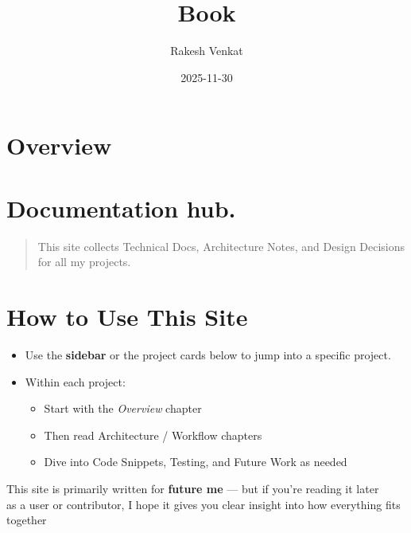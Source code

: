 \documentclass[
  letterpaper,
  DIV=11,
  numbers=noendperiod]{scrreprt}
\title{Book}
\author{Rakesh Venkat}
\date{2025-11-30}
\providecommand{\tightlist}{%
  \setlength{\itemsep}{0pt}\setlength{\parskip}{0pt}}
\renewcommand*\contentsname{Table of contents}
\newcommand\contentsname{Table of contents}
\begin{document}
\maketitle

\renewcommand*\contentsname{Table of contents}
{
\hypersetup{linkcolor=}
\setcounter{tocdepth}{3}
\tableofcontents
}


\chapter{Overview}\label{overview}


\chapter{Documentation hub.}\label{documentation-hub.}

\begin{quote}
This site collects Technical Docs, Architecture Notes, and Design
Decisions for all my projects.
\end{quote}


\chapter{How to Use This Site}\label{how-to-use-this-site}

\begin{itemize}
\tightlist
\item
  Use the \textbf{sidebar} or the project cards below to jump into a
  specific project.\\
\item
  Within each project:

  \begin{itemize}
  \tightlist
  \item
    Start with the \emph{Overview} chapter
  \item
    Then read Architecture / Workflow chapters
  \item
    Dive into Code Snippets, Testing, and Future Work as needed
  \end{itemize}
\end{itemize}

This site is primarily written for \textbf{future me} --- but if you're
reading it later\\
as a user or contributor, I hope it gives you clear insight into how
everything fits together
\end{document}
